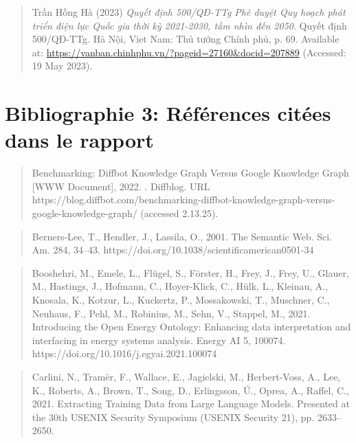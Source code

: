 \documentclass[a4paper,11pt]{report}
\begin{document}
\begin{quote}
Trần Hồng Hà (2023) \emph{Quyết định 500/QĐ-TTg Phê duyệt Quy hoạch phát triển điện lực Quốc gia thời kỳ 2021-2030, tầm nhìn đến 2050}. Quyết định 500/QĐ-TTg. Hà Nội, Viet Nam: Thủ tướng Chính phủ, p. 69. Available at: \url{https://vanban.chinhphu.vn/?pageid=27160\&docid=207889} (Accessed: 19 May 2023).
\end{quote}

\begin{quote}
\end{quote}

\chapter{Bibliographie 3: Références citées dans le rapport}\label{bibliographie-3-ruxe9fuxe9rences-cituxe9es-dans-le-rapport}

\begin{quote}
Benchmarking: Diffbot Knowledge Graph Versus Google Knowledge Graph {[}WWW Document{]}, 2022. . Diffblog. URL https://blog.diffbot.com/benchmarking-diffbot-knowledge-graph-versus-google-knowledge-graph/ (accessed 2.13.25).
\end{quote}

\begin{quote}
Berners-Lee, T., Hendler, J., Lassila, O., 2001. The Semantic Web. Sci. Am. 284, 34--43. https://doi.org/10.1038/scientificamerican0501-34
\end{quote}

\begin{quote}
Booshehri, M., Emele, L., Flügel, S., Förster, H., Frey, J., Frey, U., Glauer, M., Hastings, J., Hofmann, C., Hoyer-Klick, C., Hülk, L., Kleinau, A., Knosala, K., Kotzur, L., Kuckertz, P., Mossakowski, T., Muschner, C., Neuhaus, F., Pehl, M., Robinius, M., Sehn, V., Stappel, M., 2021. Introducing the Open Energy Ontology: Enhancing data interpretation and interfacing in energy systems analysis. Energy AI 5, 100074. https://doi.org/10.1016/j.egyai.2021.100074
\end{quote}

\begin{quote}
Carlini, N., Tramèr, F., Wallace, E., Jagielski, M., Herbert-Voss, A., Lee, K., Roberts, A., Brown, T., Song, D., Erlingsson, Ú., Oprea, A., Raffel, C., 2021. Extracting Training Data from Large Language Models. Presented at the 30th USENIX Security Symposium (USENIX Security 21), pp. 2633--2650.
\end{quote}
\end{document}
